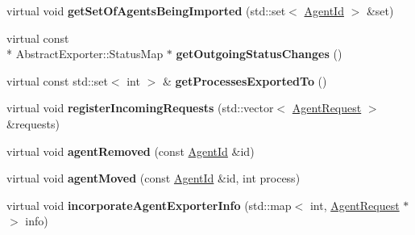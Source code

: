 \begin{DoxyCompactItemize}
\item 
\hypertarget{classrepast_1_1_abstract_importer_exporter_a16060c7a93655595503f58570d41f49d}{virtual void {\bfseries get\-Set\-Of\-Agents\-Being\-Imported} (std\-::set$<$ \hyperlink{classrepast_1_1_agent_id}{Agent\-Id} $>$ \&set)}\label{classrepast_1_1_abstract_importer_exporter_a16060c7a93655595503f58570d41f49d}

\item 
\hypertarget{classrepast_1_1_abstract_importer_exporter_a85f8dc96a48418f591745d360c513b5c}{virtual const \\*
Abstract\-Exporter\-::\-Status\-Map $\ast$ {\bfseries get\-Outgoing\-Status\-Changes} ()}\label{classrepast_1_1_abstract_importer_exporter_a85f8dc96a48418f591745d360c513b5c}

\item 
\hypertarget{classrepast_1_1_abstract_importer_exporter_adc150d387a323d81470344d11996b321}{virtual const std\-::set$<$ int $>$ \& {\bfseries get\-Processes\-Exported\-To} ()}\label{classrepast_1_1_abstract_importer_exporter_adc150d387a323d81470344d11996b321}

\item 
\hypertarget{classrepast_1_1_abstract_importer_exporter_af42a1139f782278898edc7ab0250be8c}{virtual void {\bfseries register\-Incoming\-Requests} (std\-::vector$<$ \hyperlink{classrepast_1_1_agent_request}{Agent\-Request} $>$ \&requests)}\label{classrepast_1_1_abstract_importer_exporter_af42a1139f782278898edc7ab0250be8c}

\item 
\hypertarget{classrepast_1_1_abstract_importer_exporter_aaf387c8453d07233e0aa00f128378bd9}{virtual void {\bfseries agent\-Removed} (const \hyperlink{classrepast_1_1_agent_id}{Agent\-Id} \&id)}\label{classrepast_1_1_abstract_importer_exporter_aaf387c8453d07233e0aa00f128378bd9}

\item 
\hypertarget{classrepast_1_1_abstract_importer_exporter_a17611d6966c083c3fe23a44e74284e9a}{virtual void {\bfseries agent\-Moved} (const \hyperlink{classrepast_1_1_agent_id}{Agent\-Id} \&id, int process)}\label{classrepast_1_1_abstract_importer_exporter_a17611d6966c083c3fe23a44e74284e9a}

\item 
\hypertarget{classrepast_1_1_abstract_importer_exporter_ac8dff9fe69a412ed9ff662952f9fc5b7}{virtual void {\bfseries incorporate\-Agent\-Exporter\-Info} (std\-::map$<$ int, \hyperlink{classrepast_1_1_agent_request}{Agent\-Request} $\ast$ $>$ info)}\label{classrepast_1_1_abstract_importer_exporter_ac8dff9fe69a412ed9ff662952f9fc5b7}


\end{DoxyCompactItemize}
